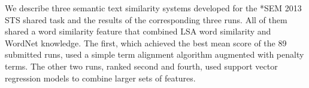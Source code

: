 We describe three semantic text similarity systems developed for the *SEM 2013 STS shared task and the results of the corresponding three runs. All of them
 shared a word similarity feature that combined LSA word similarity and WordNet
 knowledge. The first, which achieved the best mean score of the 89 submitted
 runs, used a simple term alignment algorithm augmented with penalty
 terms. The other two runs, ranked second and fourth, used support vector
 regression models to combine larger sets of features.

